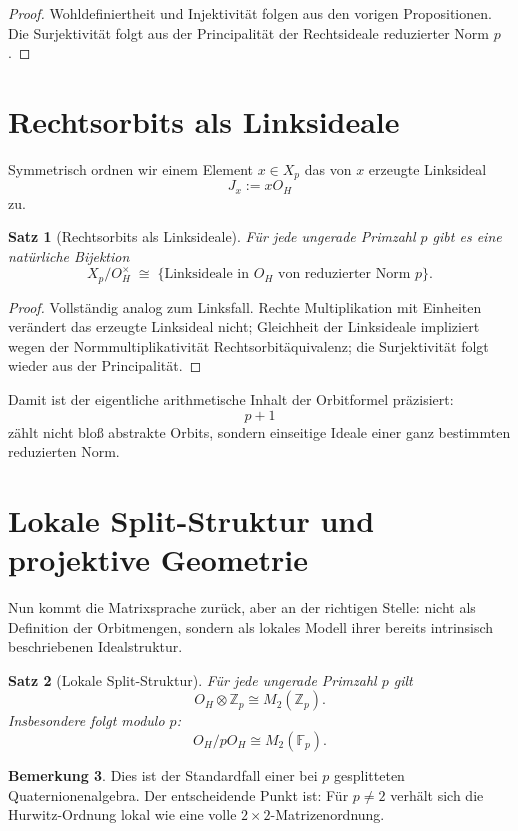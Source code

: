 \documentclass[12pt,a4paper]{article}
\newtheorem{satz}{Satz}[section]
\theoremstyle{definition}
\newtheorem{bemerkung}[satz]{Bemerkung}
\newcommand{\OH}{O_H}
\newcommand{\Z}{\mathbb{Z}}
\newcommand{\Fp}{\mathbb{F}_p}
\begin{document}
	\begin{proof}
		Wohldefiniertheit und Injektivität folgen aus den vorigen Propositionen. Die Surjektivität folgt aus der Principalität der Rechtsideale reduzierter Norm \(p\).
	\end{proof}
	
	\section{Rechtsorbits als Linksideale}
	
	Symmetrisch ordnen wir einem Element \(x\in X_p\) das von \(x\) erzeugte Linksideal
	\[
	J_x:=x\OH
	\]
	zu.
	
	\begin{satz}[Rechtsorbits als Linksideale]
		Für jede ungerade Primzahl \(p\) gibt es eine natürliche Bijektion
		\[
		X_p/\OH^\times
		\;\cong\;
		\{\text{Linksideale in }\OH\text{ von reduzierter Norm }p\}.
		\]
	\end{satz}
	
	\begin{proof}
		Vollständig analog zum Linksfall. Rechte Multiplikation mit Einheiten verändert das erzeugte Linksideal nicht; Gleichheit der Linksideale impliziert wegen der Normmultiplikativität Rechtsorbitäquivalenz; die Surjektivität folgt wieder aus der Principalität.
	\end{proof}
	
	Damit ist der eigentliche arithmetische Inhalt der Orbitformel präzisiert:
	\[
	p+1
	\]
	zählt nicht bloß abstrakte Orbits, sondern einseitige Ideale einer ganz bestimmten reduzierten Norm.
	
	\section{Lokale Split-Struktur und projektive Geometrie}
	
	Nun kommt die Matrixsprache zurück, aber an der richtigen Stelle: nicht als Definition der Orbitmengen, sondern als lokales Modell ihrer bereits intrinsisch beschriebenen Idealstruktur.
	
	\begin{satz}[Lokale Split-Struktur]
		Für jede ungerade Primzahl \(p\) gilt
		\[
		\OH\otimes \Z_p \cong M_2(\Z_p).
		\]
		Insbesondere folgt modulo \(p\):
		\[
		\OH/p\OH \cong M_2(\Fp).
		\]
	\end{satz}
	
	\begin{bemerkung}
		Dies ist der Standardfall einer bei \(p\) gesplitteten Quaternionenalgebra. Der entscheidende Punkt ist: Für \(p\neq 2\) verhält sich die Hurwitz-Ordnung lokal wie eine volle \(2\times2\)-Matrizenordnung.
	\end{bemerkung}
	
\end{document}
